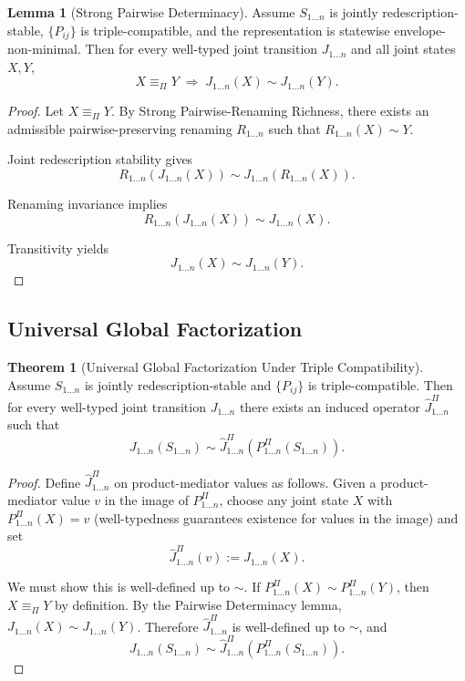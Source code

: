 \documentclass[11pt]{article}
\theoremstyle{definition}
\newtheorem{lemma}{Lemma}
\newtheorem{theorem}{Theorem}
\begin{document}
\begin{lemma}[Strong Pairwise Determinacy]
Assume $S_{1\ldots n}$ is jointly redescription-stable,
$\{P_{ij}\}$ is triple-compatible,
and the representation is statewise envelope-non-minimal.
Then for every well-typed joint transition $J_{1\ldots n}$ and all joint states $X,Y$,
\[
X \equiv_{\Pi} Y \;\Rightarrow\; J_{1\ldots n}(X) \sim J_{1\ldots n}(Y).
\]
\end{lemma}

\begin{proof}
Let $X \equiv_{\Pi} Y$.
By Strong Pairwise-Renaming Richness, there exists an admissible pairwise-preserving renaming
$R_{1\ldots n}$ such that $R_{1\ldots n}(X) \sim Y$.

Joint redescription stability gives
\[
R_{1\ldots n}(J_{1\ldots n}(X)) \sim J_{1\ldots n}(R_{1\ldots n}(X)).
\]

Renaming invariance implies
\[
R_{1\ldots n}(J_{1\ldots n}(X)) \sim J_{1\ldots n}(X).
\]

Transitivity yields
\[
J_{1\ldots n}(X) \sim J_{1\ldots n}(Y).
\]
\end{proof}


\subsection{Universal Global Factorization}

\begin{theorem}[Universal Global Factorization Under Triple Compatibility]
Assume $S_{1\ldots n}$ is jointly redescription-stable and $\{P_{ij}\}$ is triple-compatible.
Then for every well-typed joint transition $J_{1\ldots n}$ there exists an induced operator
$\widehat{J}^{\Pi}_{1\ldots n}$ such that
\[
J_{1\ldots n}(S_{1\ldots n}) \sim \widehat{J}^{\Pi}_{1\ldots n}(P^{\Pi}_{1\ldots n}(S_{1\ldots n})).
\]
\end{theorem}

\begin{proof}
Define $\widehat{J}^{\Pi}_{1\ldots n}$ on product-mediator values as follows.
Given a product-mediator value $v$ in the image of $P^{\Pi}_{1\ldots n}$, choose any joint state $X$ with
$P^{\Pi}_{1\ldots n}(X)=v$ (well-typedness guarantees existence for values in the image) and set
\[
\widehat{J}^{\Pi}_{1\ldots n}(v) := J_{1\ldots n}(X).
\]

We must show this is well-defined up to $\sim$.
If $P^{\Pi}_{1\ldots n}(X)\sim P^{\Pi}_{1\ldots n}(Y)$, then $X\equiv_{\Pi} Y$ by definition.
By the Pairwise Determinacy lemma, $J_{1\ldots n}(X)\sim J_{1\ldots n}(Y)$.
Therefore $\widehat{J}^{\Pi}_{1\ldots n}$ is well-defined up to $\sim$, and
\[
J_{1\ldots n}(S_{1\ldots n}) \sim \widehat{J}^{\Pi}_{1\ldots n}(P^{\Pi}_{1\ldots n}(S_{1\ldots n})).
\]
\end{proof}
\end{document}
